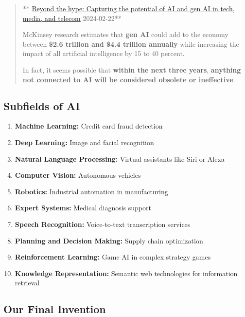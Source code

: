 \documentclass[
  letterpaper,
  DIV=11,
  numbers=noendperiod]{scrartcl}
\providecommand{\tightlist}{%
  \setlength{\itemsep}{0pt}\setlength{\parskip}{0pt}}
\begin{document}
\begin{quote}
**
\href{https://www.mckinsey.com/industries/technology-media-and-telecommunications/our-insights/beyond-the-hype-capturing-the-potential-of-ai-and-gen-ai-in-tmt\#/}{Beyond
the hype: Capturing the potential of AI and gen AI in tech, media, and
telecom} 2024-02-22**

McKinsey research estimates that \textbf{gen AI} could add to the
economy between \textbf{\$2.6 trillion and \$4.4 trillion annually}
while increasing the impact of all artificial intelligence by 15 to 40
percent.

In fact, it seems possible that \textbf{within the next three years},
\textbf{anything not connected to AI will be considered obsolete or
ineffective}.
\end{quote}

\subsection{Subfields of AI}\label{subfields-of-ai}

\begin{enumerate}
\def\labelenumi{\arabic{enumi}.}
\tightlist
\item
  \textbf{Machine Learning:} Credit card fraud detection
\item
  \textbf{Deep Learning:} Image and facial recognition
\item
  \textbf{Natural Language Processing:} Virtual assistants like Siri or
  Alexa
\item
  \textbf{Computer Vision:} Autonomous vehicles
\item
  \textbf{Robotics:} Industrial automation in manufacturing
\item
  \textbf{Expert Systems:} Medical diagnosis support
\item
  \textbf{Speech Recognition:} Voice-to-text transcription services
\item
  \textbf{Planning and Decision Making:} Supply chain optimization
\item
  \textbf{Reinforcement Learning:} Game AI in complex strategy games
\item
  \textbf{Knowledge Representation:} Semantic web technologies for
  information retrieval
\end{enumerate}

\subsection{Our Final Invention}\label{our-final-invention}
\end{document}
